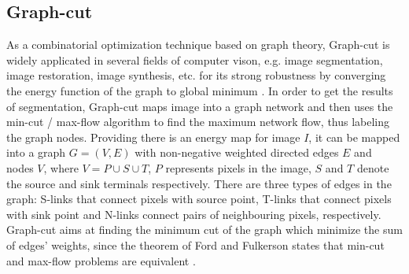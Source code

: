 \documentclass[journal]{IEEEtran}
\begin{document}
\subsection{Graph-cut}
As a combinatorial optimization technique based on graph theory, Graph-cut is widely applicated in several fields of computer vison, e.g. image segmentation, image restoration, image synthesis, etc. for its strong robustness by converging the energy function of the graph to global minimum \cite{Boykov2004,Kwatra2003Graphcut}. In order to get the results of segmentation, Graph-cut maps image into a graph network and then uses the min-cut / max-flow algorithm to find the maximum network flow, thus labeling the graph nodes. Providing there is an energy map for image $I$, it can be mapped into a graph $G=\left( V,E\right) $ with non-negative weighted directed edges $E$ and nodes $V$, where $V=P\cup  S\cup T$, $P$ represents pixels in the image, $S$ and $T$ denote the source and sink terminals respectively. There are three types of edges in the graph: S-links that connect pixels with source point, T-links that connect pixels with sink point and N-links connect pairs of neighbouring pixels, respectively. Graph-cut aims at finding the minimum cut of the graph which minimize the sum of edges' weights, since the theorem of Ford and Fulkerson states that min-cut and max-flow problems are equivalent \cite{FordJr2015}.\par
\end{document}
